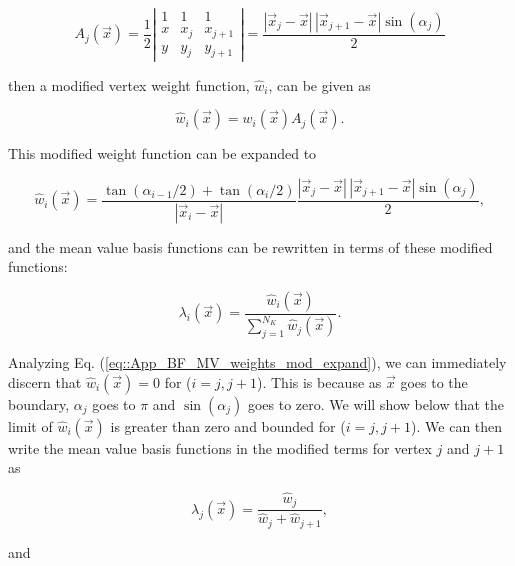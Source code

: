 \begin{equation}
\label{eq::App_BF_MV_weights_mod}
A_j (\vec{x}) = \frac{1}{2} 
\left|
\begin{array}{ccc}
1&1&1\\
x&x_j&x_{j+1}\\
y&y_j&y_{j+1}
\end{array}
\right|
= \frac{| \vec{x}_j - \vec{x} | \,| \vec{x}_{j+1} - \vec{x} | \sin (\alpha_j)}{2}
\end{equation}

\noindent then a modified vertex weight function, $\hat{w}_i$, can be given as

\begin{equation}
\label{eq::App_BF_MV_weights_mod}
\hat{w}_i (\vec{x})  = w_i (\vec{x}) A_j (\vec{x}) .
\end{equation}

\noindent This modified weight function can be expanded to

\begin{equation}
\label{eq::App_BF_MV_weights_mod_expand}
\hat{w}_i (\vec{x})  = \frac{\tan(\alpha_{i-1} / 2) + \tan(\alpha_i / 2)}{|\vec{x}_i - \vec{x}|} \frac{| \vec{x}_j - \vec{x} | \,|\vec{x}_{j+1} - \vec{x} | \sin (\alpha_j)}{2},
\end{equation}

\noindent and the mean value basis functions can be rewritten in terms of these modified functions:

\begin{equation}
\label{eq::App_BF_MVBF_mod}
\lambda_i (\vec{x}) = \frac{\hat{w}_i  (\vec{x}) }{\sum\limits_{j=1}^{N_K} \hat{w}_j  (\vec{x}) } .
\end{equation}

\noindent Analyzing Eq. (\ref{eq::App_BF_MV_weights_mod_expand}), we can immediately discern that $\hat{w}_i (\vec{x}) = 0 $ for ($i=j,j+1$). This is because as $\vec{x}$ goes to the boundary, $\alpha_j$ goes to $\pi$ and $\sin (\alpha_j)$ goes to zero. We will show below that the limit of $\hat{w}_i (\vec{x}) $ is greater than zero and bounded for ($i=j,j+1$). We can then write the mean value basis functions in the modified terms for vertex $j$ and $j+1$ as 

\begin{equation}
\label{eq::App_BF_MVBF_mod_j}
\lambda_j (\vec{x}) = \frac{\hat{w}_j  }{\hat{w}_j+ \hat{w}_{j+1} } ,
\end{equation}

\noindent and

